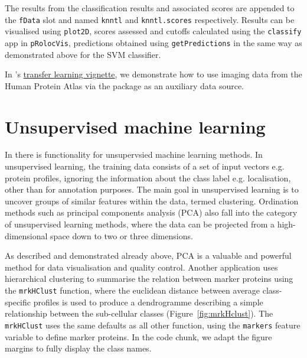 \begin{knitrout}
\begin{kframe}
\begin{alltt}
 \hlkwb{<-}     \hlstd{=} \hlstd{(}\hlstd{,} \hlstd{))}
\end{alltt}
\end{kframe}
\end{knitrout}

The results from the classification results and associated scores are
appended to the \texttt{fData} slot and named \texttt{knntl} and
\texttt{knntl.scores} respectively. Results can be visualised using
\texttt{plot2D}, scores assessed and cutoffs calculated using the
\texttt{classify} app in \texttt{pRolocVis}, predictions obtained
using \texttt{getPredictions} in the same way as demonstrated above
for the SVM classifier.

In 's
\href{http://bioconductor.org/packages/release/bioc/vignettes/pRoloc/inst/doc/pRoloc-transfer-learning.pdf}{transfer
  learning vignette}, we demonstrate how to use imaging data from the
Human Protein Atlas \cite{Uhlen:2010} via the  package
\cite{hpar} as an auxiliary data source.

\section*{Unsupervised machine learning}

In  there is functionality for unsupervsied machine
learning methods. In unsupervised learning, the training data consists
of a set of input vectors e.g. protein profiles, ignoring the
information about the class label e.g. localisation, other than for
annotation purposes. The main goal in unsupervised learning is to
uncover groups of similar features within the data, termed
clustering. Ordination methods such as principal components analysis
(PCA) also fall into the category of unsupervised learning methods,
where the data can be projected from a high-dimensional space down to
two or three dimensions.

As described and demonstrated already above, PCA is a valuable and
powerful method for data visualisation and quality control. Another
application uses hierarchical clustering to summarise the relation
between marker proteins using the \texttt{mrkHClust} function, where
the euclidean distance between average class-specific profiles is used
to produce a dendrogramme describing a simple relationship between the
sub-cellular classes (Figure~\ref{fig:mrkHclust}). The
\texttt{mrkHClust} uses the same defaults as all other function, using
the \texttt{markers} feature variable to define marker proteins. In
the code chunk, we adapt the figure margins to fully display the class
names.

